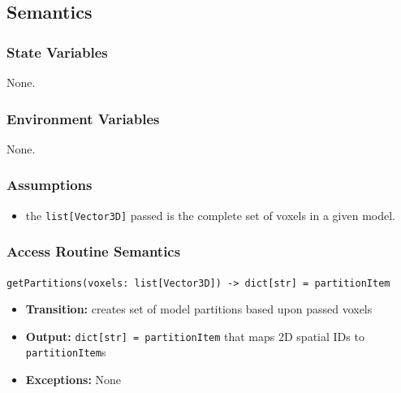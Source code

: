 \documentclass[12pt, titlepage]{article}
\begin{document}
\subsection{Semantics}

\subsubsection{State Variables}
None.

\subsubsection{Environment Variables}
None.

\subsubsection{Assumptions}
  \begin{itemize}
    \item the \texttt{list[Vector3D]} passed is the complete set of voxels in a given model.
  \end{itemize}
\newpage

\subsubsection{Access Routine Semantics}
\texttt{getPartitions(voxels: list[Vector3D]) -> dict[str] = partitionItem}
\begin{itemize}
  \item \textbf{Transition:} creates set of model partitions based upon passed voxels
  \item \textbf{Output:} \texttt{dict[str] = partitionItem} that maps 2D spatial IDs to \texttt{partitionItem}s
  \item \textbf{Exceptions:} None
\end{itemize}
\end{document}
